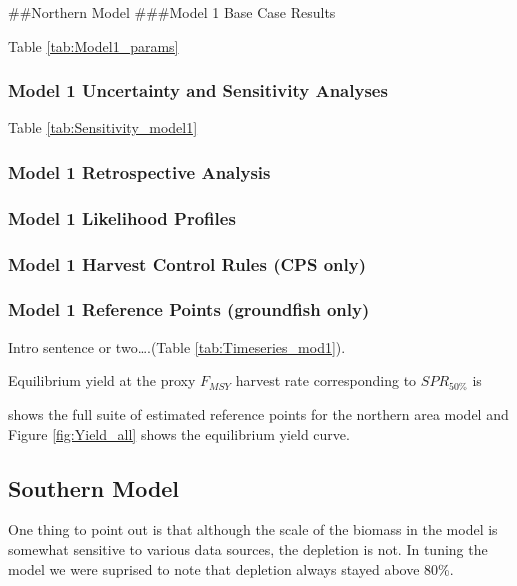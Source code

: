 \documentclass[12pt,]{article}
\begin{document}
\clearpage
 \#\#Northern Model \#\#\#Model 1 Base Case Results

Table \ref{tab:Model1_params}

\subsubsection{Model 1 Uncertainty and Sensitivity
Analyses}\label{model-1-uncertainty-and-sensitivity-analyses}

Table \ref{tab:Sensitivity_model1}

\subsubsection{Model 1 Retrospective
Analysis}\label{model-1-retrospective-analysis}

\subsubsection{Model 1 Likelihood
Profiles}\label{model-1-likelihood-profiles}

\subsubsection{Model 1 Harvest Control Rules (CPS
only)}\label{model-1-harvest-control-rules-cps-only}

\subsubsection{Model 1 Reference Points (groundfish
only)}\label{model-1-reference-points-groundfish-only}

Intro sentence or two\ldots{}.(Table \ref{tab:Timeseries_mod1}).

Equilibrium yield at the proxy \(F_{MSY}\) harvest rate corresponding to
\(SPR_{50\%}\) is

shows the full suite of estimated reference points for the northern area
model and Figure \ref{fig:Yield_all} shows the equilibrium yield curve.

\clearpage

\subsection{Southern Model}\label{southern-model}

One thing to point out is that although the scale of the biomass in the
model is somewhat sensitive to various data sources, the depletion is
not. In tuning the model we were suprised to note that depletion always
stayed above 80\%.
\end{document}
